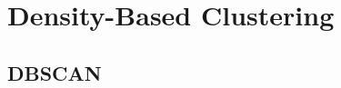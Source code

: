 \chapter{Density-Based Clustering}
\begin{refsection}
%


\printbibliography[heading=subbibliography]

\section{DBSCAN}

\end{refsection}
